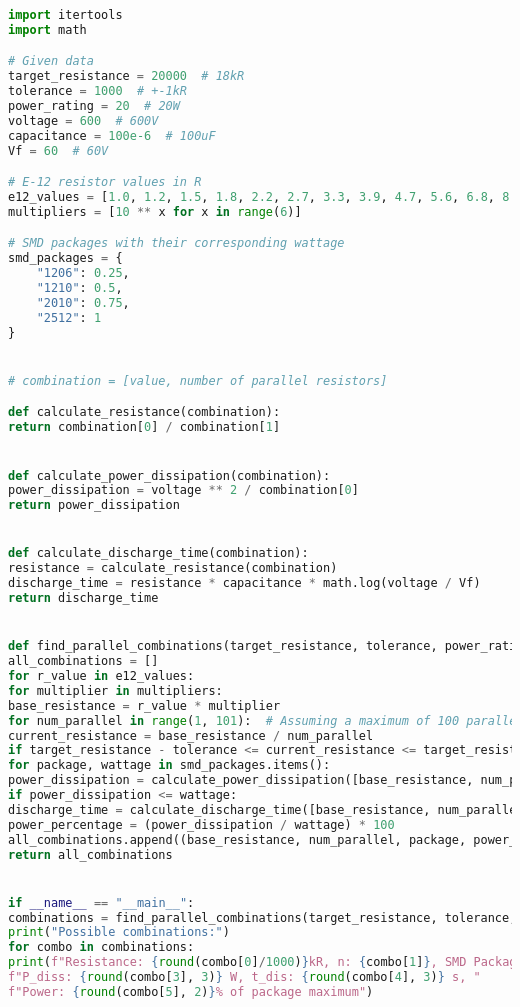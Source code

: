 \begin{lstlisting}[language=Python, basicstyle=\ttfamily\small, breaklines=true, frame=single]
import itertools
import math

# Given data
target_resistance = 20000  # 18kR
tolerance = 1000  # +-1kR
power_rating = 20  # 20W
voltage = 600  # 600V
capacitance = 100e-6  # 100uF
Vf = 60  # 60V

# E-12 resistor values in R
e12_values = [1.0, 1.2, 1.5, 1.8, 2.2, 2.7, 3.3, 3.9, 4.7, 5.6, 6.8, 8.2]
multipliers = [10 ** x for x in range(6)]

# SMD packages with their corresponding wattage
smd_packages = {
	"1206": 0.25,
	"1210": 0.5,
	"2010": 0.75,
	"2512": 1
}


# combination = [value, number of parallel resistors]

def calculate_resistance(combination):
return combination[0] / combination[1]


def calculate_power_dissipation(combination):
power_dissipation = voltage ** 2 / combination[0]
return power_dissipation


def calculate_discharge_time(combination):
resistance = calculate_resistance(combination)
discharge_time = resistance * capacitance * math.log(voltage / Vf)
return discharge_time


def find_parallel_combinations(target_resistance, tolerance, power_rating):
all_combinations = []
for r_value in e12_values:
for multiplier in multipliers:
base_resistance = r_value * multiplier
for num_parallel in range(1, 101):  # Assuming a maximum of 100 parallel resistors
current_resistance = base_resistance / num_parallel
if target_resistance - tolerance <= current_resistance <= target_resistance + tolerance:
for package, wattage in smd_packages.items():
power_dissipation = calculate_power_dissipation([base_resistance, num_parallel])
if power_dissipation <= wattage:
discharge_time = calculate_discharge_time([base_resistance, num_parallel])
power_percentage = (power_dissipation / wattage) * 100
all_combinations.append((base_resistance, num_parallel, package, power_dissipation, discharge_time, power_percentage))
return all_combinations


if __name__ == "__main__":
combinations = find_parallel_combinations(target_resistance, tolerance, power_rating)
print("Possible combinations:")
for combo in combinations:
print(f"Resistance: {round(combo[0]/1000)}kR, n: {combo[1]}, SMD Package: {combo[2]}, "
f"P_diss: {round(combo[3], 3)} W, t_dis: {round(combo[4], 3)} s, "
f"Power: {round(combo[5], 2)}% of package maximum")
	
\end{lstlisting}


